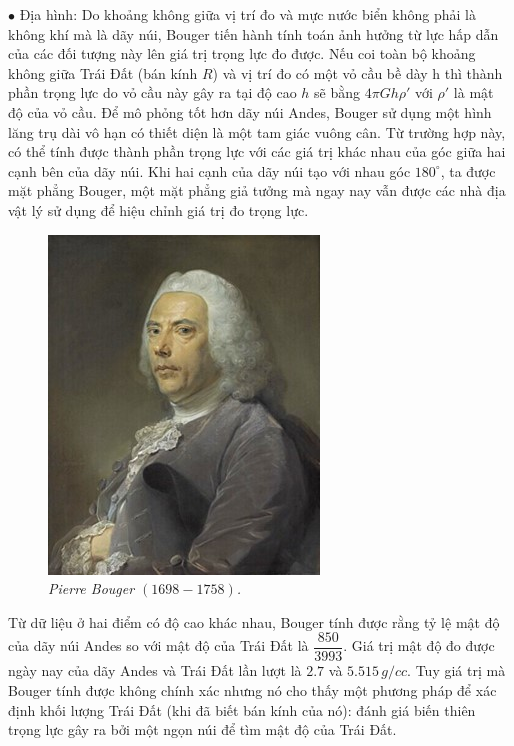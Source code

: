 \begin{multicols}{2}
	\vskip 0.1cm
	$\bullet$ Địa hình: Do khoảng không giữa vị trí đo và mực nước biển không phải là không khí mà là dãy núi, Bouger tiến hành tính toán ảnh hưởng từ lực hấp dẫn của các đối tượng này lên giá trị trọng lực đo được. Nếu coi toàn bộ khoảng không giữa Trái Đất (bán kính $R$) và vị trí đo có một vỏ cầu bề dày h thì thành phần trọng lực do vỏ cầu này gây ra tại độ cao $h$ sẽ bằng $4\pi Gh\rho'$ với $\rho'$ là mật độ của vỏ cầu. Để mô phỏng tốt hơn dãy núi Andes, Bouger sử dụng một hình lăng trụ dài vô hạn có thiết diện là một tam giác vuông cân. Từ trường hợp này, có thể tính được thành phần trọng lực với các giá trị khác nhau của góc giữa hai cạnh bên của dãy núi. Khi hai cạnh của dãy núi tạo với nhau góc $180^\circ$, ta được mặt phẳng Bouger, một mặt phẳng giả tưởng mà ngay nay vẫn được các nhà địa vật lý sử dụng để hiệu chỉnh giá trị đo trọng lực.
	\begin{figure}[H]
		\vspace*{-5pt}
		\centering
		\captionsetup{labelformat= empty, justification=centering}
		\includegraphics[width =0.75\linewidth]{7}
		\caption{\small\textit{\color{timhieukhoahoc}Pierre Bouger $(1698 - 1758)$.}}
		\vspace*{-10pt}
	\end{figure}
	Từ dữ liệu ở hai điểm có độ cao khác nhau, Bouger tính được rằng tỷ lệ mật độ của dãy núi Andes so với mật độ của Trái Đất là $\dfrac{850}{3993}$. Giá trị mật độ đo được ngày nay của dãy Andes và Trái Đất lần lượt là $2{.}7$ và $5{.}515\, g/cc$. Tuy giá trị mà Bouger tính được không chính xác nhưng nó cho thấy một phương pháp để xác định khối lượng Trái Đất (khi đã biết bán kính của nó): đánh giá biến thiên trọng lực gây ra bởi một ngọn núi để tìm mật độ của Trái Đất.

\end{multicols}
